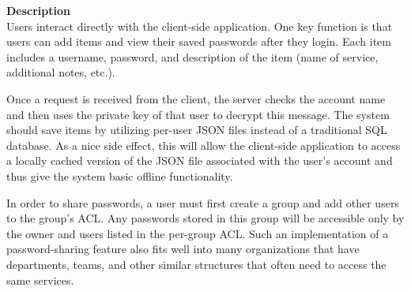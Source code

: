 \documentclass[11pt, letterpaper]{article}
\newcommand{\ProposalSection}[1]
{\noindent\textbf{#1}\\}
\begin{document}
\ProposalSection{Description}

Users interact directly with the client-side application. One key function is that users can add items and view their saved passwords after they login. Each item includes a username, password, and description of the item (name of service, additional notes, etc.).

Once a request is received from the client, the server checks the account name and then uses the private key of that user to decrypt this message. The system should save items by utilizing per-user JSON files instead of a traditional SQL database. As a nice side effect, this will allow the client-side application to access a locally cached version of the JSON file associated with the user’s account and thus give the system basic offline functionality.

In order to share passwords, a user must first create a group and add other users to the group’s ACL. Any passwords stored in this group will be accessible only by the owner and users listed in the per-group ACL. Such an implementation of a password-sharing feature also fits well into many organizations that have departments, teams, and other similar structures that often need to access the same services.
\end{document}
